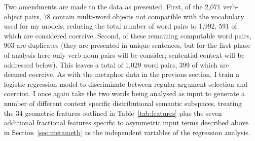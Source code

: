 Two amendments are made to the data as presented.  First, of the 2,071 verb-object pairs, 78 contain multi-word objects not compatible with the vocabulary used for my models, reducing the total number of word pairs to 1,992, 591 of which are considered coercive.  Second, of these remaining computable word pairs, 903 are duplicates (they are presented in unique sentences, but for the first phase of analysis here only verb-noun pairs will be consider; sentential context will be addressed below).  This leaves a total of 1,029 word pairs, 399 of which are deemed coercive.  As with the metaphor data in the previous section, I train a logistic regression model to discriminate between regular argument selection and coercion.  I once again take the two words being analysed as input to generate a number of different context specific distributional semantic subspaces, treating the 34 geometric features outlined in Table~\ref{tab:features} plus the seven additional fractional features specific to asymmetric input terms described above in Section~\ref{sec:metameth} as the independent variables of the regression analysis.  


